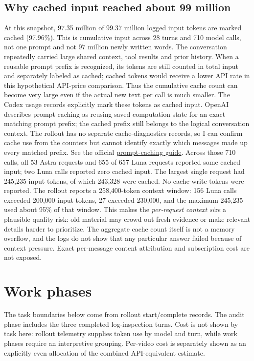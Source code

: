 \documentclass[10pt]{article}
\begin{document}
\subsection*{Why cached input reached about 99 million}
At this snapshot, 97.35 million of 99.37 million logged input tokens are marked cached (97.96\%). This is cumulative input across 28 turns and 710 model calls, not one prompt and not 97 million newly written words. The conversation repeatedly carried large shared context, tool results and prior history. When a reusable prompt prefix is recognized, its tokens are still counted in total input and separately labeled as cached; cached tokens would receive a lower API rate in this hypothetical API-price comparison. Thus the cumulative cache count can become very large even if the actual new text per call is much smaller. The Codex usage records explicitly mark these tokens as cached input. OpenAI describes prompt caching as reusing saved computation state for an exact matching prompt prefix; the cached prefix still belongs to the logical conversation context. The rollout has no separate cache-diagnostics records, so I can confirm cache use from the counters but cannot identify exactly which messages made up every matched prefix. See the official \href{https://developers.openai.com/api/docs/guides/prompt-caching}{prompt-caching guide}. Across those 710 calls, all 53 Astra requests and 655 of 657 Luna requests reported some cached input; two Luna calls reported zero cached input. The largest single request had 245,235 input tokens, of which 243,328 were cached. No cache-write tokens were reported. The rollout reports a 258,400-token context window: 156 Luna calls exceeded 200,000 input tokens, 27 exceeded 230,000, and the maximum 245,235 used about 95\% of that window. This makes the \emph{per-request context size} a plausible quality risk: old material may crowd out fresh evidence or make relevant details harder to prioritize. The aggregate cache count itself is not a memory overflow, and the logs do not show that any particular answer failed because of context pressure. Exact per-message content attribution and subscription cost are not exposed.

\section{Work phases}
The task boundaries below come from rollout start/complete records. The audit phase includes the three completed log-inspection turns. Cost is not shown by task here: rollout telemetry supplies token use by model and turn, while work phases require an interpretive grouping. Per-video cost is separately shown as an explicitly even allocation of the combined API-equivalent estimate.
\end{document}
